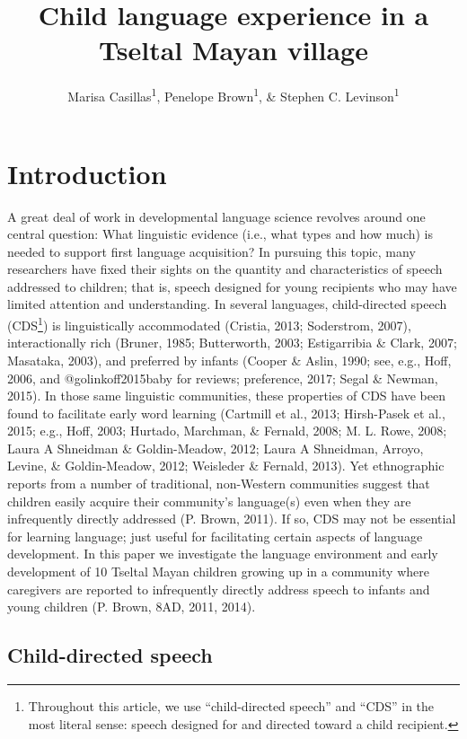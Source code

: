 \documentclass[floatsintext,man]{apa6}
\title{Child language experience in a Tseltal Mayan village}
\author{Marisa Casillas\textsuperscript{1}, Penelope Brown\textsuperscript{1}, \& Stephen C. Levinson\textsuperscript{1}}
\affiliation{
    \vspace{0.5cm}
          \textsuperscript{1} Max Planck Institute for Psycholinguistics  }
\theoremstyle{definition}
\theoremstyle{definition}
\theoremstyle{definition}
\theoremstyle{remark}
\begin{document}
\maketitle

\setcounter{secnumdepth}{0}



\section{Introduction}\label{intro}

A great deal of work in developmental language science revolves around
one central question: What linguistic evidence (i.e., what types and how
much) is needed to support first language acquisition? In pursuing this
topic, many researchers have fixed their sights on the quantity and
characteristics of speech addressed to children; that is, speech
designed for young recipients who may have limited attention and
understanding. In several languages, child-directed speech
(CDS\footnote{Throughout this article, we use \enquote{child-directed
  speech} and \enquote{CDS} in the most literal sense: speech designed
  for and directed toward a child recipient.}) is linguistically
accommodated (Cristia, 2013; Soderstrom, 2007), interactionally rich
(Bruner, 1985; Butterworth, 2003; Estigarribia \& Clark, 2007; Masataka,
2003), and preferred by infants (Cooper \& Aslin, 1990; see, e.g., Hoff,
2006, and @golinkoff2015baby for reviews; preference, 2017; Segal \&
Newman, 2015). In those same linguistic communities, these properties of
CDS have been found to facilitate early word learning (Cartmill et al.,
2013; Hirsh-Pasek et al., 2015; e.g., Hoff, 2003; Hurtado, Marchman, \&
Fernald, 2008; M. L. Rowe, 2008; Laura A Shneidman \& Goldin-Meadow,
2012; Laura A Shneidman, Arroyo, Levine, \& Goldin-Meadow, 2012;
Weisleder \& Fernald, 2013). Yet ethnographic reports from a number of
traditional, non-Western communities suggest that children easily
acquire their community's language(s) even when they are infrequently
directly addressed (P. Brown, 2011). If so, CDS may not be essential for
learning language; just useful for facilitating certain aspects of
language development. In this paper we investigate the language
environment and early development of 10 Tseltal Mayan children growing
up in a community where caregivers are reported to infrequently directly
address speech to infants and young children (P. Brown, 8AD, 2011,
2014).

\subsection{Child-directed speech}\label{intro-cds}
\end{document}

